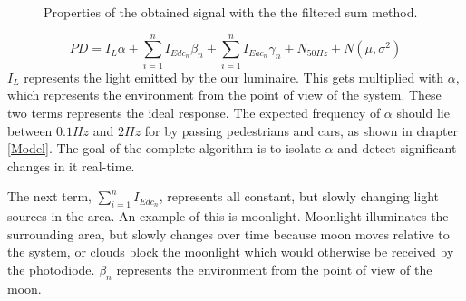 \begin{figure}
	\centering     %
	\caption{Properties of the obtained signal with the the filtered sum method.\label{Signal_properties}}
\end{figure}

\begin{equation}
\label{eq:Pd_light}
PD = I_{L} \alpha + \sum_{i=1}^n I_{Edc_{n}} \beta_{n} + \sum_{i=1}^n I_{Eac{_n}} \gamma_{n} + N_{50Hz} + N(\mu,\sigma^2)
\end{equation}
$I_{L}$ represents the light emitted by the our luminaire. This gets multiplied with $\alpha$, which represents the environment from the point of view of the system. These two terms represents the ideal response. The expected frequency of $\alpha$ should lie between $0.1Hz$ and $2Hz$ for by passing pedestrians and cars, as shown in chapter \ref{Model}. The goal of the complete algorithm is to isolate $\alpha$ and detect significant changes in it real-time.

The next term, $\sum_{i=1}^n I_{Edc_{n}}$, represents all constant, but slowly changing light sources in the area. An example of this is moonlight. Moonlight illuminates the surrounding area, but slowly changes over time because moon moves relative to the system, or clouds block the moonlight which would otherwise be received by the photodiode. $\beta_{n}$ represents the environment from the point of view of the moon.
	
